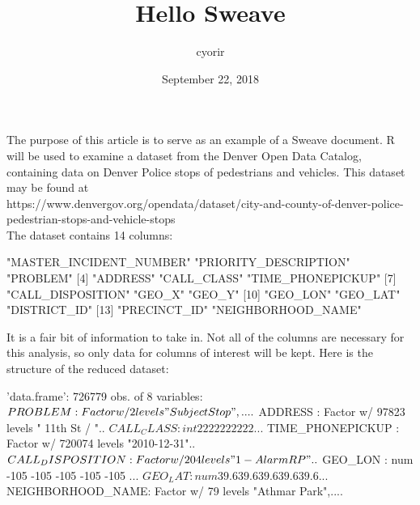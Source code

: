 \documentclass{article}
\begin{document}


\title{Hello Sweave}
\author{cyorir}
\date{September 22, 2018}

\maketitle

The purpose of this article is to serve as an example of a Sweave document. R will be used to examine a dataset from the Denver Open Data Catalog, containing data on Denver Police stops of pedestrians and vehicles. This dataset may be found at \\

https://www.denvergov.org/opendata/dataset/city-and-county-of-denver-police-pedestrian-stops-and-vehicle-stops \\

The dataset contains 14 columns: \\

\begin{Schunk}
\begin{Soutput}
 [1] "MASTER_INCIDENT_NUMBER" "PRIORITY_DESCRIPTION"   "PROBLEM"               
 [4] "ADDRESS"                "CALL_CLASS"             "TIME_PHONEPICKUP"      
 [7] "CALL_DISPOSITION"       "GEO_X"                  "GEO_Y"                 
[10] "GEO_LON"                "GEO_LAT"                "DISTRICT_ID"           
[13] "PRECINCT_ID"            "NEIGHBORHOOD_NAME"     
\end{Soutput}
\end{Schunk}

It is a fair bit of information to take in. Not all of the columns are necessary for this analysis, so only data for columns of interest will be kept. Here is the structure of the reduced dataset: \\

\begin{Schunk}
\begin{Soutput}
'data.frame':	726779 obs. of  8 variables:
 $ PROBLEM          : Factor w/ 2 levels "Subject Stop",....
 $ ADDRESS          : Factor w/ 97823 levels " 11th St / "..
 $ CALL_CLASS       : int  2 2 2 2 2 2 2 2 2 2 ...
 $ TIME_PHONEPICKUP : Factor w/ 720074 levels "2010-12-31"..
 $ CALL_DISPOSITION : Factor w/ 204 levels "1 - Alarm RP "..
 $ GEO_LON          : num  -105 -105 -105 -105 -105 ...
 $ GEO_LAT          : num  39.6 39.6 39.6 39.6 39.6 ...
 $ NEIGHBORHOOD_NAME: Factor w/ 79 levels "Athmar Park",....
\end{Soutput}
\end{Schunk}
\end{document}
